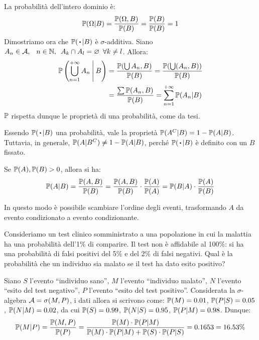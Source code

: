 \begin{dimo}
  La probabilità dell'intero dominio è:
  $$\mathbb P(\Omega | B) = \frac {\mathbb P(\Omega , B)} {\mathbb P(B)} =
  \frac {\mathbb P(B)} {\mathbb P(B)} = 1$$
  Dimostriamo ora che $\PP(\, \bigcdot \, | B)$ è $\sigma$-additiva.
  Siano $A_n \in \mathcal A, \; \enspace n \in \mathbb N,\enspace A_k \cap A_l = \varnothing \enspace \forall k \neq l$. Allora:
  \begin{align*}
  \mathbb P \left( \bigcup\limits_{n=1}^{{+\infty}} A_n \>\middle|\> B \right)
  &= \frac {\mathbb P(\bigcup A_n, B)} {\mathbb P(B)}
  = \frac {\mathbb P(\bigcup (A_n, B))} {\mathbb P(B)}\\
  &= \frac {\sum \mathbb P(A_n, B)} {\mathbb P(B)}
  = \sum\limits_{n=1}^{{+\infty}} \mathbb P(A_n | B)
  \end{align*}
$\mathbb P$ rispetta dunque le proprietà di una probabilità, come da tesi. \qedhere
\end{dimo}

\smallskip
\begin{nb}
  Essendo $\PP(\, \bigcdot \, | B)$ una probabilità, vale la proprietà $\mathbb P(A^C | B) = 1 - \mathbb P(A | B)$.
  Tuttavia, in generale, $\mathbb P(A | B^C) \neq 1 - \mathbb P(A | B)$, perché
  $\PP(\, \bigcdot \, | B)$ è definito con un $B$ fissato.
\end{nb}

\medskip
\begin{coro}
  \label{dimo-bayes}
  Se $\mathbb P(A), \mathbb P(B) > 0$, allora si ha:
  $$
  \mathbb P(A | B)
  = \frac {\mathbb P(A, B)} {\mathbb P(B)}
  = \frac {\mathbb P(A, B)} {\mathbb P(B)} \cdot \frac {\mathbb P(A)} {\mathbb P(A)}
  = \mathbb P(B | A) \cdot \frac {\mathbb P(A)} {\mathbb P(B)}
  $$
\end{coro}
In questo modo è possibile scambiare l'ordine degli eventi, trasformando $A$ da evento condizionato a evento condizionante.
\bigskip

\begin{ese}
Consideriamo un test clinico somministrato a una popolazione
in cui la malattia ha una probabilità dell'1\% di comparire.
Il test non è affidabile al 100\%: si ha una probabilità di falsi positivi del
5\% e del 2\% di falsi negativi.
Qual è la probabilità che un
individuo sia malato se il test ha dato esito positivo?

Siano $S$ l'evento ``individuo sano'', $M$ l'evento ``individuo malato'',
$N$ l'evento ``esito del test negativo'', $P$ l'evento ``esito del test positivo''.
Considerata la $\sigma$-algebra $\mathcal A = \sigma(M, P)$, i dati allora si
scrivono come: $\mathbb P(M) = 0.01$, $\mathbb P(P|S) = 0.05$, $\mathbb P(N|M) = 0.02$,
da cui $\mathbb P(S) = 0.99$, $\mathbb P(N|S) = 0.95$, $\mathbb P(P|M) = 0.98$.
Dunque:
$$
  \mathbb P(M|P) = \frac {\mathbb P(M, P)} {\mathbb P(P)}
  = \frac {\mathbb P(M) \cdot \mathbb P(P|M)}
  {\mathbb P(M) \cdot \mathbb P(P|M) + \mathbb P(S) \cdot \mathbb P(P|S)} = 0.1653 = 16.53\% $$
\end{ese}

